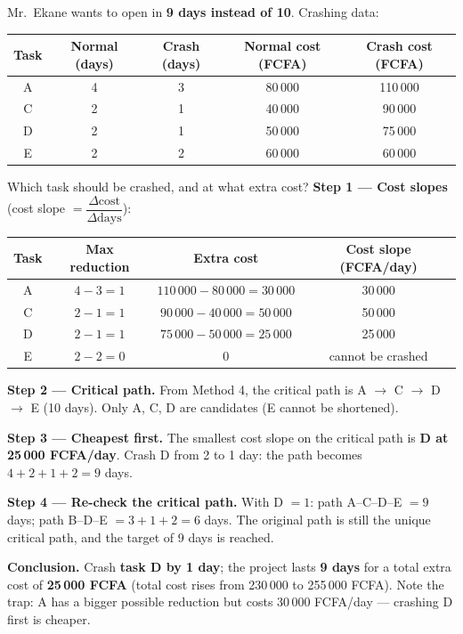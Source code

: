 \documentclass[11pt]{article}
\begin{document}
\begin{exoresolu}
Mr.\ Ekane wants to open in \textbf{9 days instead of 10}. Crashing data:
\begin{center}
\begin{tabular}{|c|c|c|c|c|}\hline
\rowcolor{popblueL} \textbf{Task} & \textbf{Normal (days)} & \textbf{Crash (days)} & \textbf{Normal cost (FCFA)} & \textbf{Crash cost (FCFA)} \\ \hline
A & 4 & 3 & 80\,000 & 110\,000 \\ \hline
C & 2 & 1 & 40\,000 & 90\,000 \\ \hline
D & 2 & 1 & 50\,000 & 75\,000 \\ \hline
E & 2 & 2 & 60\,000 & 60\,000 \\ \hline
\end{tabular}
\end{center}
Which task should be crashed, and at what extra cost?
\tcblower
\textbf{Step 1 — Cost slopes} (cost slope $= \dfrac{\Delta \text{cost}}{\Delta \text{days}}$):
\begin{center}
\begin{tabular}{|c|c|c|c|}\hline
\rowcolor{popblueL} \textbf{Task} & \textbf{Max reduction} & \textbf{Extra cost} & \textbf{Cost slope (FCFA/day)} \\ \hline
A & $4-3 = 1$ & $110\,000 - 80\,000 = 30\,000$ & 30\,000 \\ \hline
C & $2-1 = 1$ & $90\,000 - 40\,000 = 50\,000$ & 50\,000 \\ \hline
D & $2-1 = 1$ & $75\,000 - 50\,000 = 25\,000$ & 25\,000 \\ \hline
E & $2-2 = 0$ & 0 & cannot be crashed \\ \hline
\end{tabular}
\end{center}
\textbf{Step 2 — Critical path.} From Method 4, the critical path is A $\to$ C $\to$ D $\to$ E (10 days). Only A, C, D are candidates (E cannot be shortened).

\textbf{Step 3 — Cheapest first.} The smallest cost slope on the critical path is \textbf{D at 25\,000 FCFA/day}. Crash D from 2 to 1 day: the path becomes $4+2+1+2 = 9$ days.

\textbf{Step 4 — Re-check the critical path.} With D $=1$: path A--C--D--E $= 9$ days; path B--D--E $= 3+1+2 = 6$ days. The original path is still the unique critical path, and the target of 9 days is reached.

\textbf{Conclusion.} Crash \textbf{task D by 1 day}; the project lasts \textbf{9 days} for a total extra cost of \textbf{25\,000 FCFA} (total cost rises from 230\,000 to 255\,000 FCFA). Note the trap: A has a bigger possible reduction but costs 30\,000 FCFA/day — crashing D first is cheaper.
\end{exoresolu}
\end{document}
